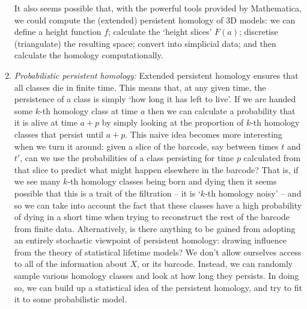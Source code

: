 \documentclass[12pt]{article}
\numberwithin{equation}{subsection}
\numberwithin{theorem}{subsection}
\numberwithin{lemma}{subsection}
\numberwithin{corollary}{subsection}
\numberwithin{definition}{subsection}
\numberwithin{example}{subsection}
\numberwithin{note}{subsection}
\begin{document}
\begin{enumerate}
                It also seems possible that, with the powerful tools provided by Mathematica, we could compute the (extended) persistent homology of 3D models: we can define a height function $f$; calculate the `height slices' $F(a)$; discretise (triangulate) the resulting space; convert into simplicial data; and then calculate the homology computationally.
            \item \emph{Probabilistic persistent homology:} Extended persistent homology ensures that all classes die in finite time.
                This means that, at any given time, the persistence of a class is simply `how long it has left to live'.
                If we are handed some $k$-th homology class at time $a$ then we can calculate a probability that it is alive at time $a+p$ by simply looking at the proportion of $k$-th homology classes that persist until $a+p$.
                This naive idea becomes more interesting when we turn it around: given a slice of the barcode, say between times $t$ and $t'$, can we use the probabilities of a class persisting for time $p$ calculated from that slice to predict what might happen elsewhere in the barcode?
                That is, if we see many $k$-th homology classes being born and dying then it seems possible that this is a trait of the filtration -- it is `$k$-th homology noisy' -- and so we can take into account the fact that these classes have a high probability of dying in a short time when trying to reconstruct the rest of the barcode from finite data.
                Alternatively, is there anything to be gained from adopting an entirely stochastic viewpoint of persistent homology: drawing influence from the theory of statistical lifetime models?
                We don't allow ourselves access to all of the information about $X$, or its barcode.
                Instead, we can randomly sample various homology classes and look at how long they persists.
                In doing so, we can build up a statistical idea of the persistent homology, and try to fit it to some probabilistic model.
        \end{enumerate}



    


\end{document}
